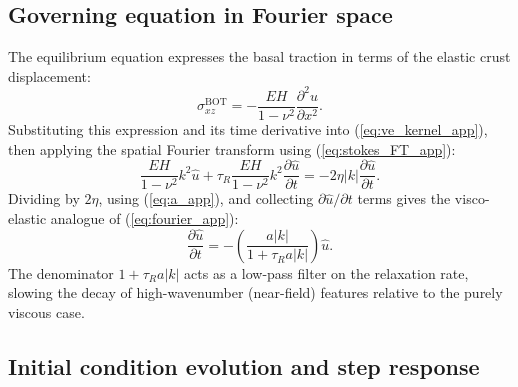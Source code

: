 \documentclass[12pt]{article}
\begin{document}
\subsection*{Governing equation in Fourier space}

The equilibrium equation expresses the basal traction in terms
of the elastic crust displacement:
\begin{equation}
\sigma_{xz}^{\text{BOT}} = -\frac{EH}{1-\nu^2}\frac{\partial^2 u}{\partial x^2}.
\end{equation}
Substituting this expression and its time derivative into
(\ref{eq:ve_kernel_app}), then applying the spatial Fourier transform
using (\ref{eq:stokes_FT_app}):
\begin{equation}
\frac{EH}{1-\nu^2}k^2\hat{u}
+ \tau_R\frac{EH}{1-\nu^2}k^2\frac{\partial\hat{u}}{\partial t}
= -2\eta|k|\frac{\partial\hat{u}}{\partial t}.
\end{equation}
Dividing by $2\eta$, using (\ref{eq:a_app}), and collecting
$\partial\hat{u}/\partial t$ terms gives the visco-elastic analogue of
(\ref{eq:fourier_app}):
\begin{equation}
\frac{\partial\hat{u}}{\partial t}
= -\left(\frac{a|k|}{1+\tau_R a|k|}\right)\hat{u}.
\label{eq:maxwell_fourier_app}
\end{equation}
The denominator $1+\tau_R a|k|$ acts as a low-pass filter on the relaxation
rate, slowing the decay of high-wavenumber (near-field) features relative to
the purely viscous case.

\subsection*{Initial condition evolution and step response}
\end{document}
